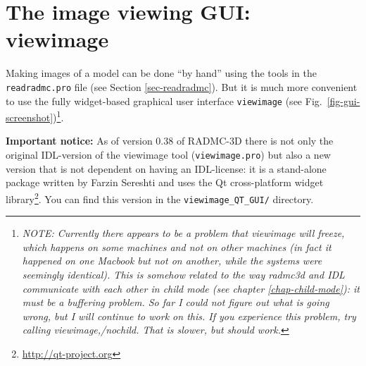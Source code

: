 \documentclass{report}
\begin{document}
\section{The image viewing GUI: viewimage}
\label{sec-viewimage-gui}
%
Making images of a model can be done ``by hand'' using the tools in the
{\small\tt readradmc.pro} file (see Section \ref{sec-readradmc}). But it is
much more convenient to use the fully widget-based graphical user interface
{\small\tt viewimage} (see Fig.~\ref{fig-gui-screenshot})\footnote{\em
  NOTE: Currently there appears to be a problem that viewimage will freeze,
  which happens on some machines and not on other machines (in fact it
  happened on one Macbook but not on another, while the systems were
  seemingly identical). This is somehow related to the way radmc3d and IDL
  communicate with each other in child mode (see chapter
  \ref{chap-child-mode}): it must be a buffering problem. So far I could not
  figure out what is going wrong, but I will continue to work on this. If
  you experience this problem, try calling viewimage,/nochild. That is
  slower, but should work.}.

{\bf Important notice:} As of version 0.38 of RADMC-3D there is not only the
original IDL-version of the viewimage tool ({\small\tt viewimage.pro}) but
also a new version that is not dependent on having an IDL-license: it is a
stand-alone package written by Farzin Sereshti and uses the Qt
cross-platform widget library\footnote{\url{http://qt-project.org}}. You can
find this version in the {\small\tt viewimage\_QT\_GUI/} directory.
\end{document}
